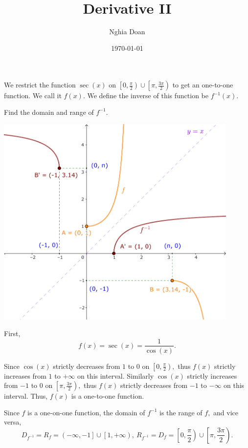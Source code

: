 \documentclass{article}
\title{Derivative II}
\author{Nghia Doan}
\date{\today}
\begin{document}
\maketitle

\begin{problem*}[1a]
    We restrict the function $\sec(x)$ on $\left[ 0, \frac{\pi}{2} \right) \cup \left[ \pi, \frac{3\pi}{2} \right)$ to get an one-to-one function.
    We call it $f(x).$ We define the inverse of this function be $f^{-1}(x).$

    Find the domain and range of $f^{-1}.$
\end{problem*}

\begin{center}
    \includegraphics[width=12cm]{./svg/pdf/derivative-2-1a.pdf}
\end{center}

\begin{soln}
    First,
    \[
        f(x) = \sec(x) = \frac{1}{\cos(x)}.
    \]

    Since $\cos(x)$ strictly decreases from $1$ to $0$ on $\left[ 0, \frac{\pi}{2} \right),$ 
    thus $f(x)$ strictly increases from $1$ to $+\infty$ on this interval.
    Similarly $\cos(x)$ strictly increases from $-1$ to $0$ on $\left[ \pi, \frac{3\pi}{2} \right),$ 
    thus $f(x)$ strictly decreases from $-1$ to $-\infty$ on this interval.
    Thus, $f(x)$ is a one-to-one function.

    Since $f$ is a one-on-one function, the domain of $f^{-1}$ is the range of $f,$ and vice versa,
    \[
        D_{f^{-1}} = R_f = \left( -\infty, -1 \right] \cup \left[ 1, +\infty \right),\
        R_{f^{-1}} = D_f = \left[ 0, \frac{\pi}{2} \right) \cup \left[ \pi, \frac{3\pi}{2} \right).
    \]
\end{soln}
\end{document}
